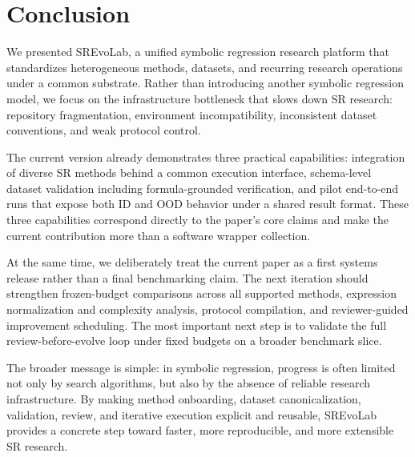 \section{Conclusion}

We presented SREvoLab, a unified symbolic regression research platform that standardizes heterogeneous methods, datasets, and recurring research operations under a common substrate. Rather than introducing another symbolic regression model, we focus on the infrastructure bottleneck that slows down SR research: repository fragmentation, environment incompatibility, inconsistent dataset conventions, and weak protocol control.

The current version already demonstrates three practical capabilities: integration of diverse SR methods behind a common execution interface, schema-level dataset validation including formula-grounded verification, and pilot end-to-end runs that expose both ID and OOD behavior under a shared result format. These three capabilities correspond directly to the paper's core claims and make the current contribution more than a software wrapper collection.

At the same time, we deliberately treat the current paper as a first systems release rather than a final benchmarking claim. The next iteration should strengthen frozen-budget comparisons across all supported methods, expression normalization and complexity analysis, protocol compilation, and reviewer-guided improvement scheduling. The most important next step is to validate the full review-before-evolve loop under fixed budgets on a broader benchmark slice.

The broader message is simple: in symbolic regression, progress is often limited not only by search algorithms, but also by the absence of reliable research infrastructure. By making method onboarding, dataset canonicalization, validation, review, and iterative execution explicit and reusable, SREvoLab provides a concrete step toward faster, more reproducible, and more extensible SR research.
